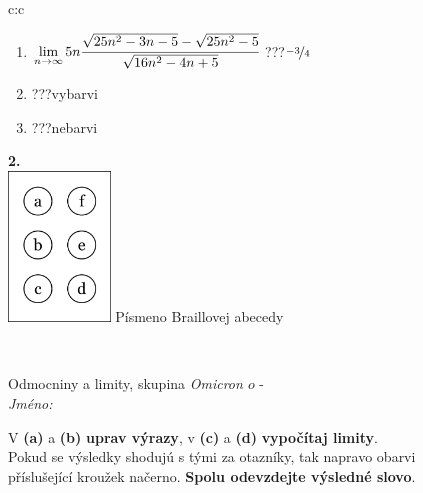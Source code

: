\documentclass[10pt]{report}
\newcommand\omicron{o}
\begin{document}
\begin{tabular}{c:c}
\begin{minipage}[c][104.5mm][t]{0.5\linewidth}
\begin{center}
\begin{minipage}{0.79\linewidth}
\begin{center}
\begin{varwidth}{\linewidth}
\begin{enumerate}
\item $\lim\limits_{n\to\infty}5n\cfrac{\sqrt{25n^2-3n-5}-\sqrt{25n^2-5}}{\sqrt{16n^2-4n+5}}$\quad \dotfill\; ???\;\dotfill \quad $\nicefrac{-3}{4}$
\item \quad \dotfill\; ???\;\dotfill \quad vybarvi
\item \quad \dotfill\; ???\;\dotfill \quad nebarvi
\end{enumerate}
\end{varwidth}
\end{center}
\end{minipage}
\begin{minipage}{0.20\linewidth}
\begin{center}
{\Huge\bfseries 2.} \\[2mm]
\includegraphics[height=40mm]{../images/braille.png}
{\small Písmeno Braillovej abecedy}
\end{center}
\end{minipage}
\end{center}
\end{minipage}
\\ \hdashline
\begin{minipage}[c][104.5mm][t]{0.5\linewidth}
\begin{center}
\vspace{7mm}
{\huge Odmocniny a limity, skupina \textit{Omicron $\omicron$} -}\\[5mm]
\textit{Jméno:}\phantom{xxxxxxxxxxxxxxxxxxxxxxxxxxxxxxxxxxxxxxxxxxxxxxxxxxxxxxxxxxxxxxxxx}\\[5mm]
\begin{minipage}{0.95\linewidth}
\begin{center}
V \textbf{(a)} a \textbf{(b)} \textbf{uprav výrazy}, v \textbf{(c)} a \textbf{(d)} \textbf{vypočítaj limity}.\\Pokud se výsledky shodujú s tými za otazníky, tak napravo obarvi\\příslušející kroužek načerno. \textbf{Spolu odevzdejte výsledné slovo}.
\end{center}
\end{minipage}
\\[1mm]

\end{center}
\end{minipage}
\end{tabular}
\end{document}
